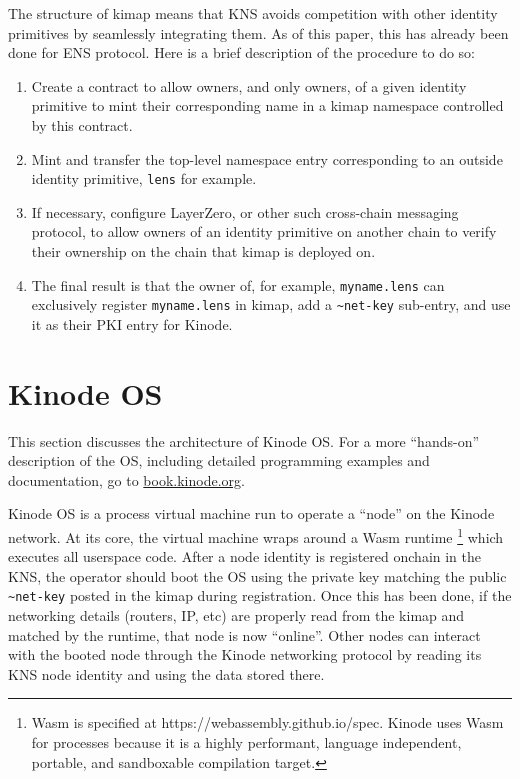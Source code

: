 \documentclass[runningheads]{llncs}
\begin{document}
The structure of kimap means that KNS avoids competition with other identity primitives by seamlessly integrating them.
As of this paper, this has already been done for ENS protocol.
Here is a brief description of the procedure to do so:
\begin{enumerate}
    \item Create a contract to allow owners, and only owners, of a given identity primitive to mint their corresponding name in a kimap namespace controlled by this contract.
    \item Mint and transfer the top-level namespace entry corresponding to an outside identity primitive, \verb|lens| for example.
    \item If necessary, configure LayerZero, or other such cross-chain messaging protocol, to allow owners of an identity primitive on another chain to verify their ownership on the chain that kimap is deployed on.
    \item The final result is that the owner of, for example, \verb|myname.lens| can exclusively register \verb|myname.lens| in kimap, add a \verb|~net-key| sub-entry, and use it as their PKI entry for Kinode.
\end{enumerate}

\section{Kinode OS}
\label{sec:os}

This section discusses the architecture of Kinode OS.
For a more ``hands-on'' description of the OS, including detailed programming examples and documentation, go to \href{https://book.kinode.org/}{book.kinode.org}.

Kinode OS is a process virtual machine run to operate a ``node'' on the Kinode network.
At its core, the virtual machine wraps around a Wasm runtime
\footnote{Wasm is specified at https://webassembly.github.io/spec. Kinode uses Wasm for processes because it is a highly performant, language independent, portable, and sandboxable compilation target.}
which executes all userspace code.
After a node identity is registered onchain in the KNS, the operator should boot the OS using the private key matching the public \verb|~net-key| posted in the kimap during registration.
Once this has been done, if the networking details (routers, IP, etc) are properly read from the kimap and matched by the runtime, that node is now ``online''.
Other nodes can interact with the booted node through the Kinode networking protocol by reading its KNS node identity and using the data stored there.
\end{document}
